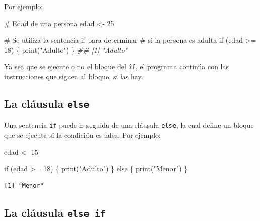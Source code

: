 \documentclass[
  letterpaper,
  DIV=11,
  numbers=noendperiod]{scrreprt}
\newenvironment{Shaded}{\begin{snugshade}}{\end{snugshade}}
\newcommand{\CommentTok}[1]{\textcolor[rgb]{0.37,0.37,0.37}{#1}}
\newcommand{\ControlFlowTok}[1]{\textcolor[rgb]{0.00,0.23,0.31}{#1}}
\newcommand{\DecValTok}[1]{\textcolor[rgb]{0.68,0.00,0.00}{#1}}
\newcommand{\DocumentationTok}[1]{\textcolor[rgb]{0.37,0.37,0.37}{\textit{#1}}}
\newcommand{\FunctionTok}[1]{\textcolor[rgb]{0.28,0.35,0.67}{#1}}
\newcommand{\NormalTok}[1]{\textcolor[rgb]{0.00,0.23,0.31}{#1}}
\newcommand{\OtherTok}[1]{\textcolor[rgb]{0.00,0.23,0.31}{#1}}
\newcommand{\SpecialCharTok}[1]{\textcolor[rgb]{0.37,0.37,0.37}{#1}}
\newcommand{\StringTok}[1]{\textcolor[rgb]{0.13,0.47,0.30}{#1}}
\begin{document}
Por ejemplo:

\begin{Shaded}
\begin{Highlighting}[]
\CommentTok{\# Edad de una persona}
\NormalTok{edad }\OtherTok{\textless{}{-}} \DecValTok{25}

\CommentTok{\# Se utiliza la sentencia if para determinar }
\CommentTok{\# si la persona es adulta}
\ControlFlowTok{if}\NormalTok{ (edad }\SpecialCharTok{\textgreater{}=} \DecValTok{18}\NormalTok{) \{}
  \FunctionTok{print}\NormalTok{(}\StringTok{"Adulto"}\NormalTok{)}
\NormalTok{\}}
\DocumentationTok{\#\# [1] "Adulto"}
\end{Highlighting}
\end{Shaded}

Ya sea que se ejecute o no el bloque del \texttt{if}, el programa
continúa con las instrucciones que siguen al bloque, si las hay.

\hypertarget{la-cluxe1usula-else}{%
\subsection{\texorpdfstring{La cláusula
\texttt{else}}{La cláusula else}}\label{la-cluxe1usula-else}}

Una sentencia \texttt{if} puede ir seguida de una cláusula
\texttt{else}, la cual define un bloque que se ejecuta si la condición
es falsa. Por ejemplo:

\begin{Shaded}
\begin{Highlighting}[]
\NormalTok{edad }\OtherTok{\textless{}{-}} \DecValTok{15}

\ControlFlowTok{if}\NormalTok{ (edad }\SpecialCharTok{\textgreater{}=} \DecValTok{18}\NormalTok{) \{}
  \FunctionTok{print}\NormalTok{(}\StringTok{"Adulto"}\NormalTok{)}
\NormalTok{\} }\ControlFlowTok{else}\NormalTok{ \{}
  \FunctionTok{print}\NormalTok{(}\StringTok{"Menor"}\NormalTok{)}
\NormalTok{\}}
\end{Highlighting}
\end{Shaded}

\begin{verbatim}
[1] "Menor"
\end{verbatim}

\hypertarget{la-cluxe1usula-else-if}{%
\subsection{\texorpdfstring{La cláusula
\texttt{else\ if}}{La cláusula else if}}\label{la-cluxe1usula-else-if}}
\end{document}
